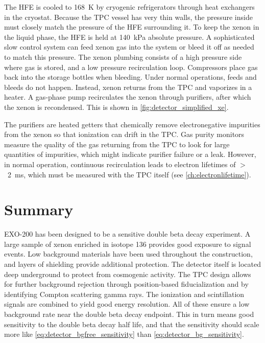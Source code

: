 \documentclass[herrin-thesis.tex]{subfiles}
\begin{document}
The HFE is cooled to \SI{168}{\K} by cryogenic refrigerators through heat exchangers in the cryostat. Because the TPC vessel has very thin walls, the pressure inside must closely match the pressure of the HFE surrounding it. To keep the xenon in the liquid phase, the HFE is held at \about{}\SI{140}{\kilo\Pa} absolute pressure. A sophisticated slow control system can feed xenon gas into the system or bleed it off as needed to match this pressure. The xenon plumbing consists of a high pressure side where gas is stored, and a low pressure recirculation loop. Compressors place gas back into the storage bottles when bleeding. Under normal operations, feeds and bleeds do not happen. Instead, xenon returns from the TPC and vaporizes in a heater. A gas-phase pump\cite{LePort:2011fk} recirculates the xenon through purifiers, after which the xenon is recondensed. This is shown in \cref{fig:detector_simplified_xe}. 

The purifiers are heated  getters\cite{SAESgetters} that chemically remove electronegative impurities from the xenon so that ionization can drift in the TPC. Gas purity monitors\cite{Dobi:2011zr} measure the quality of the gas returning from the TPC to look for large quantities of impurities, which might indicate purifier failure or a leak. However, in normal operation, continuous recirculation leads to electron lifetimes of \(>\)~\SI{2}{\ms}, which must be measured with the TPC itself  (see \cref{ch:electronlifetime}).

\section{Summary}
EXO-200 has been designed to be a sensitive double beta decay experiment. A large sample of xenon enriched in isotope 136 provides good exposure to signal events. Low background materials have been used throughout the construction, and layers of shielding provide additional protection. The detector itself is located deep underground to protect from cosmogenic activity. The TPC design allows for further background rejection through position-based fiducialization and by identifying Compton scattering gamma rays. The ionization and scintillation signals are combined to yield good energy resolution. All of these ensure a low background rate near the double beta decay endpoint. This in turn means good sensitivity to the double beta decay half life, and that the sensitivity should scale more like \cref{eq:detector_bgfree_sensitivity} than \cref{eq:detector_bg_sensitivity}.
\end{document}
